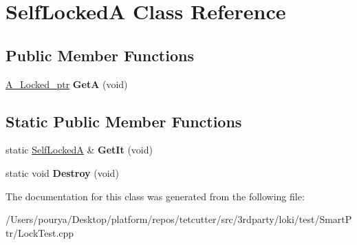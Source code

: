 \hypertarget{classSelfLockedA}{}\section{Self\+Locked\+A Class Reference}
\label{classSelfLockedA}
\subsection*{Public Member Functions}
\begin{DoxyCompactItemize}
\item 
\hypertarget{classSelfLockedA_a813eee85e7c4ab527347eefd486768ad}{}\hyperlink{classLoki_1_1SmartPtr}{A\+\_\+\+Locked\+\_\+ptr} {\bfseries Get\+A} (void)\label{classSelfLockedA_a813eee85e7c4ab527347eefd486768ad}

\end{DoxyCompactItemize}
\subsection*{Static Public Member Functions}
\begin{DoxyCompactItemize}
\item 
\hypertarget{classSelfLockedA_aaa7543487f838743bcd8cab375e3ea56}{}static \hyperlink{classSelfLockedA}{Self\+Locked\+A} \& {\bfseries Get\+It} (void)\label{classSelfLockedA_aaa7543487f838743bcd8cab375e3ea56}

\item 
\hypertarget{classSelfLockedA_a3aa2c326383bae7c5ef2c53d1743741f}{}static void {\bfseries Destroy} (void)\label{classSelfLockedA_a3aa2c326383bae7c5ef2c53d1743741f}

\end{DoxyCompactItemize}


The documentation for this class was generated from the following file\+:\begin{DoxyCompactItemize}
\item 
/\+Users/pourya/\+Desktop/platform/repos/tetcutter/src/3rdparty/loki/test/\+Smart\+Ptr/Lock\+Test.\+cpp\end{DoxyCompactItemize}
